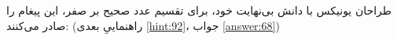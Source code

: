 \section{}
\paragraph{}\label{hint:263}
طراحان یونیکس با دانش بی‌نهایت خود، برای تقسیم عدد صحیح بر صفر، این پیغام را صادر می‌کنند:
\LTR\noindent
{}
\RTL
(راهنماییِ بعدی \ref{hint:92}، جواب \ref{answer:68})
